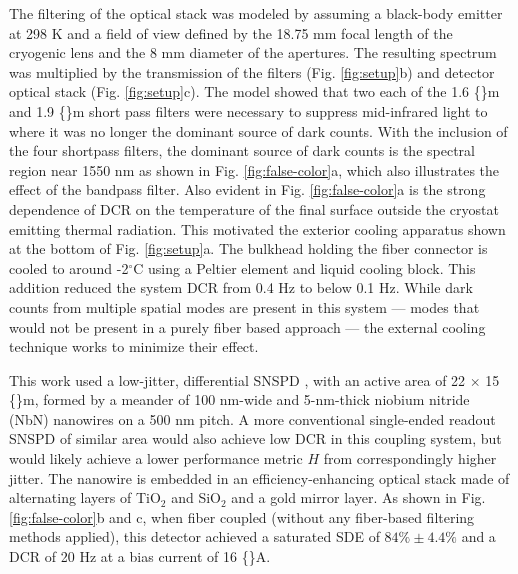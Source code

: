 \documentclass[12pt]{caltech_thesis}
\begin{document}
The filtering of the optical stack was modeled by assuming a black-body
emitter at 298 K and a field of view defined by the 18.75 mm focal
length of the cryogenic lens and the 8 mm diameter of the apertures. The
resulting spectrum was multiplied by the transmission of the filters
(Fig. \ref{fig:setup}b) and detector optical stack (Fig.
\ref{fig:setup}c). The model showed that two each of the 1.6
\{\textmu\}m and 1.9 \{\textmu\}m short pass filters were necessary to
suppress mid-infrared light to where it was no longer the dominant
source of dark counts. With the inclusion of the four shortpass filters,
the dominant source of dark counts is the spectral region near 1550 nm
as shown in Fig. \ref{fig:false-color}a, which also illustrates the
effect of the bandpass filter. Also evident in Fig.
\ref{fig:false-color}a is the strong dependence of DCR on the
temperature of the final surface outside the cryostat emitting thermal
radiation. This motivated the exterior cooling apparatus shown at the
bottom of Fig. \ref{fig:setup}a. The bulkhead holding the fiber
connector is cooled to around -2\(^\circ\)C using a Peltier element and
liquid cooling block. This addition reduced the system DCR from 0.4 Hz
to below 0.1 Hz. While dark counts from multiple spatial modes are
present in this system --- modes that would not be present in a purely
fiber based approach --- the external cooling technique works to
minimize their effect.

This work used a low-jitter, differential SNSPD \cite{Colangelo2021},
with an active area of 22 \(\times\) 15 \{\textmu\}m, formed by a
meander of 100 nm-wide and 5-nm-thick niobium nitride (NbN) nanowires on
a 500 nm pitch. A more conventional single-ended readout SNSPD of
similar area would also achieve low DCR in this coupling system, but
would likely achieve a lower performance metric \(H\) from
correspondingly higher jitter. The nanowire is embedded in an
efficiency-enhancing optical stack made of alternating layers of
TiO\(_2\) and SiO\(_2\) and a gold mirror layer. As shown in Fig.
\ref{fig:false-color}b and c, when fiber coupled (without any
fiber-based filtering methods applied), this detector achieved a
saturated SDE of \(84\% \pm 4.4 \%\) and a DCR of 20 Hz at a bias
current of 16 \{\textmu\}A.
\end{document}
